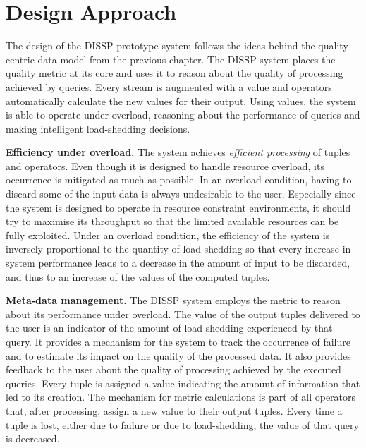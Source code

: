 \section{Design Approach}
\label{sec:design}


The design of the DISSP prototype system follows the ideas behind the quality-centric data model
from the previous chapter.
The DISSP system places the \sic quality metric at its core and uses it to reason about the
quality of processing achieved by queries.
Every stream is augmented with a \sic value and operators automatically calculate the
new values for their output.
Using \sic values, the system is able to operate under overload, reasoning about the performance of
queries and making intelligent \mbox{load-shedding} decisions.

\textbf{Efficiency under overload.}
The system achieves \emph{efficient processing} of tuples and operators. Even though it
is designed to handle resource overload, its occurrence is mitigated as much as possible.
In an overload condition, having to discard some of the input data is always
undesirable to the user. Especially since the system is designed to operate in resource constraint
environments, it should try to maximise its throughput so that the limited available resources
can be fully exploited.
Under an overload condition, the efficiency of the system is inversely proportional to the quantity of
load-shedding so that every increase in system performance leads to a decrease in the
amount of input to be discarded, and thus to an increase of the \sic values of the computed tuples.

\textbf{Meta-data management.}
The DISSP system employs the \sic metric to reason about its performance under overload. The \sic value
of the output tuples delivered to the user is an indicator of the amount of load-shedding
experienced by that query. It provides a mechanism for the system to track the occurrence of failure and
to estimate its impact on the quality of the processed data. It also provides feedback to the user about the
quality of processing achieved by the executed queries.
Every tuple is assigned a \sic value indicating the amount of information that led to its creation.
The mechanism for \sic metric calculations is part of all operators that, after processing, assign a
new \sic value to their output tuples.
Every time a tuple is lost, either due to failure or due to load-shedding, the \sic value of that query
is decreased.


